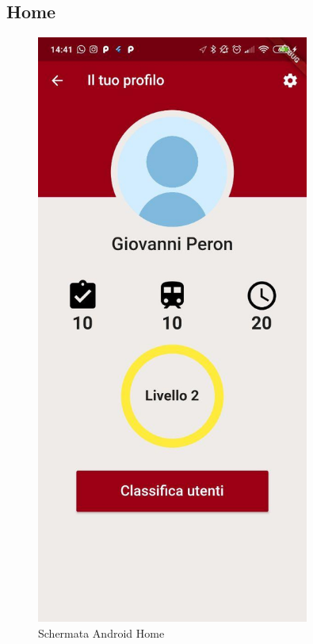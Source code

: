 \subsection{Home}
\begin{minipage}{0.45\textwidth}
\begin{figure}[H]
	\centering
	\includegraphics[width=0.8\textwidth]{immagini/profile.jpg}
	\caption{Schermata Android Home}
\end{figure}
\end{minipage}
\hfill
